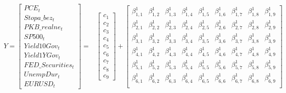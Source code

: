 \vspace{-0.5cm}
\hypertarget{row22}{}
\scriptsize
\begin{equation}
\begin{aligned}
Y =
\begin{bmatrix}
       PCE_{t} \\[0.05em]
       Stopa\_bez_{ t} \\[0.05em]
       PKB\_realne_{t} \\[0.05em]
       SP500_{t} \\[0.05em]
       Yield10Gov_{t} \\[0.05em]
       Yield1YGov_{t} \\[0.05em]
       FED\_Securities_{t} \\[0.05em]
       UnempDur_{t} \\[0.05em]
       EURUSD_{t} 
\end{bmatrix} ={} &
\begin{bmatrix}
       c_1 \\[0.05em]
       c_2 \\[0.05em]
       c_3 \\[0.05em]
       c_4 \\[0.05em]
       c_5 \\[0.05em]
       c_6 \\[0.05em]
       c_7 \\[0.05em]
       c_8 \\[0.05em]
       c_9
\end{bmatrix} +
\begin{bmatrix}
\beta^1_{1,1} & \beta^1_{1,2} & \beta^1_{1,3} & \beta^1_{1,4} & \beta^1_{1,5} & \beta^1_{1,6} & \beta^1_{1,7} & \beta^1_{1,8} &   \beta^1_{1,9} \\[0.05em]
\beta^1_{2,1} & \beta^1_{2,2} & \beta^1_{2,3} & \beta^1_{2,4} & \beta^1_{2,5} & \beta^1_{2,6} & \beta^1_{2,7} & \beta^1_{2,8} &   \beta^1_{2,9} \\[0.05em]
\beta^1_{3,1} & \beta^1_{3,2} & \beta^1_{3,3} & \beta^1_{3,4} & \beta^1_{3,5} & \beta^1_{3,6} & \beta^1_{3,7} & \beta^1_{3,8} &   \beta^1_{3,9} \\[0.05em]
\beta^1_{4,1} & \beta^1_{4,2} & \beta^1_{4,3} & \beta^1_{4,4} & \beta^1_{4,5} & \beta^1_{4,6} & \beta^1_{4,7} & \beta^1_{4,8} &   \beta^1_{4,9} \\[0.05em]
\beta^1_{5,1} & \beta^1_{5,2} & \beta^1_{5,3} & \beta^1_{5,4} & \beta^1_{5,5} & \beta^1_{5,6} & \beta^1_{5,7} & \beta^1_{5,8} &   \beta^1_{5,9} \\[0.05em]
\beta^1_{6,1} & \beta^1_{6,2} & \beta^1_{6,3} & \beta^1_{6,4} & \beta^1_{6,5} & \beta^1_{6,6} & \beta^1_{6,7} & \beta^1_{6,8} &   \beta^1_{6,9} \\[0.05em]

\end{bmatrix}
\end{aligned}
\end{equation}
